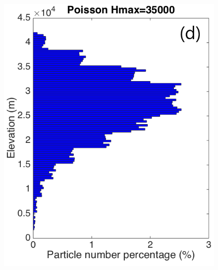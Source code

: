 \documentclass[utf8]{frontiersSCNS} %
\begin{document}
\begin{figure}[!htb]
\begin{minipage}{.247 \textwidth}
\end{minipage}%
\begin{minipage}{.247 \textwidth}
\centering
\includegraphics[width=0.99 \textwidth]{Figures/Possion-Hmax35k-ParticleDis-z}
\end{minipage}%
\\
\centering
\begin{minipage}{.247 \textwidth}
\centering

\end{minipage}
\end{figure}
\end{document}
